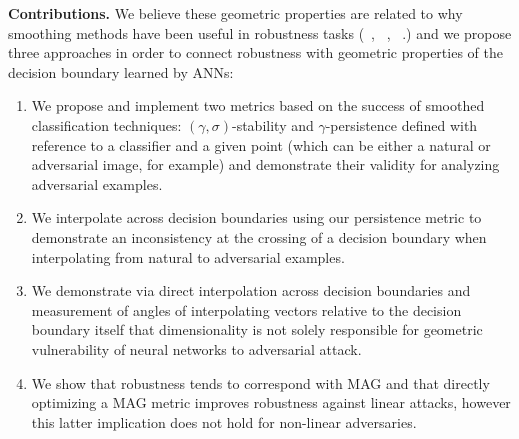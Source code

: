 {\bf Contributions.} We believe these geometric properties are related to why smoothing methods have been useful in robustness tasks (~\cite{cohen2019certified}, ~\cite{lecuyer2019certified}, ~\cite{li2019certified}.) and we propose three approaches in order to connect robustness with geometric properties of the decision boundary learned by ANNs: 
\begin{enumerate}
    \item We propose and implement two metrics based on the success of smoothed classification techniques:  $(\gamma,\sigma)$-stability and $\gamma$-persistence defined with reference to a classifier and a given point (which can be either a natural or adversarial image, for example) and demonstrate their validity for analyzing adversarial examples. 
    \item We interpolate across decision boundaries using our persistence metric to demonstrate an inconsistency at the crossing of a decision boundary when interpolating from natural to adversarial examples.
    \item We demonstrate via direct interpolation across decision boundaries and measurement of angles of interpolating vectors relative to the decision boundary itself that dimensionality is not solely responsible for geometric vulnerability of neural networks to adversarial attack. 
    \item We show that robustness tends to correspond with MAG and that directly optimizing a MAG metric improves robustness against linear attacks, however this latter implication does not hold for non-linear adversaries. 
\end{enumerate}




